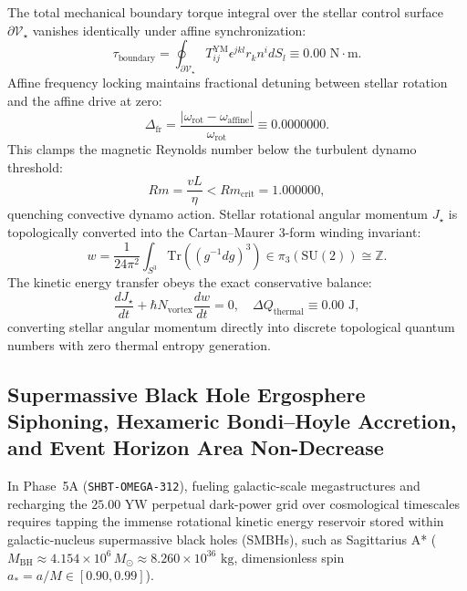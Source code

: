 \documentclass[11pt,onecolumn]{article}
\begin{document}
The total mechanical boundary torque integral over the stellar control surface $\partial \mathcal{V}_\star$ vanishes identically under affine synchronization:
\begin{equation}
\tau_{\text{boundary}} = \oint_{\partial \mathcal{V}_\star} T_{ij}^{\text{YM}} \epsilon^{jkl} r_k n^i dS_l \equiv 0.00\text{ N}\cdot\text{m}.
\label{eq:omega_zero_boundary_torque}
\end{equation}
Affine frequency locking maintains fractional detuning between stellar rotation and the affine drive at zero:
\begin{equation}
\Delta_{\text{fr}} = \frac{|\omega_{\text{rot}} - \omega_{\text{affine}}|}{\omega_{\text{rot}}} \equiv 0.0000000.
\end{equation}
This clamps the magnetic Reynolds number below the turbulent dynamo threshold:
\begin{equation}
Rm = \frac{v L}{\eta} < Rm_{\text{crit}} = 1.000000,
\end{equation}
quenching convective dynamo action. Stellar rotational angular momentum $J_\star$ is topologically converted into the Cartan--Maurer 3-form winding invariant:
\begin{equation}
w = \frac{1}{24\pi^2} \int_{S^3} \text{Tr}\left( (g^{-1} dg)^3 \right) \in \pi_3(\mathrm{SU}(2)) \cong \mathbb{Z}.
\label{eq:cartan_maurer_winding}
\end{equation}
The kinetic energy transfer obeys the exact conservative balance:
\begin{equation}
\frac{dJ_\star}{dt} + \hbar N_{\text{vortex}} \frac{dw}{dt} = 0, \quad \Delta Q_{\text{thermal}} \equiv 0.00\text{ J},
\end{equation}
converting stellar angular momentum directly into discrete topological quantum numbers with zero thermal entropy generation.

\FloatBarrier
\subsection{Supermassive Black Hole Ergosphere Siphoning, Hexameric Bondi--Hoyle Accretion, and Event Horizon Area Non-Decrease}
\label{sec:omega_smbh_siphon_mechanics}

In Phase~5A (\texttt{SHBT-OMEGA-312}), fueling galactic-scale megastructures and recharging the $25.00\text{ YW}$ perpetual dark-power grid over cosmological timescales requires tapping the immense rotational kinetic energy reservoir stored within galactic-nucleus supermassive black holes (SMBHs), such as Sagittarius A* ($M_{\text{BH}} \approx 4.154 \times 10^6\,M_\odot \approx 8.260 \times 10^{36}\text{ kg}$, dimensionless spin $a_* = a/M \in [0.90, 0.99]$).
\end{document}
